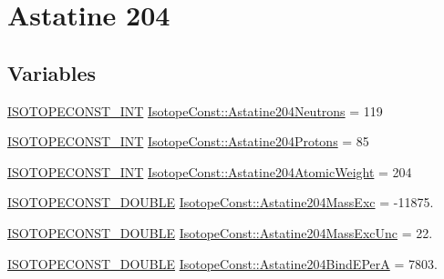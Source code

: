 \hypertarget{group___isotope_const-_astatine-_at204}{}\section{Astatine 204}
\label{group___isotope_const-_astatine-_at204}
\subsection*{Variables}
\begin{DoxyCompactItemize}
\item 
\mbox{\hyperlink{group___isotope_const-_macros_ga5f18360b3e99483a35c32d789e62621c}{I\+S\+O\+T\+O\+P\+E\+C\+O\+N\+S\+T\+\_\+\+I\+NT}} \mbox{\hyperlink{group___isotope_const-_astatine-_at204_ga74b3aeaa2b8b99206e4912ea5aa36212}{Isotope\+Const\+::\+Astatine204\+Neutrons}} = 119
\item 
\mbox{\hyperlink{group___isotope_const-_macros_ga5f18360b3e99483a35c32d789e62621c}{I\+S\+O\+T\+O\+P\+E\+C\+O\+N\+S\+T\+\_\+\+I\+NT}} \mbox{\hyperlink{group___isotope_const-_astatine-_at204_gaf269710c9aa12e3ee6357dcf76ac7651}{Isotope\+Const\+::\+Astatine204\+Protons}} = 85
\item 
\mbox{\hyperlink{group___isotope_const-_macros_ga5f18360b3e99483a35c32d789e62621c}{I\+S\+O\+T\+O\+P\+E\+C\+O\+N\+S\+T\+\_\+\+I\+NT}} \mbox{\hyperlink{group___isotope_const-_astatine-_at204_gab173ac6099c2abcbdf8fabdab9ec543c}{Isotope\+Const\+::\+Astatine204\+Atomic\+Weight}} = 204
\item 
\mbox{\hyperlink{group___isotope_const-_macros_ga8f45a7272ce02c0b4c65c44636ed719a}{I\+S\+O\+T\+O\+P\+E\+C\+O\+N\+S\+T\+\_\+\+D\+O\+U\+B\+LE}} \mbox{\hyperlink{group___isotope_const-_astatine-_at204_ga00092d0c32940a3002f6bf8c2897d751}{Isotope\+Const\+::\+Astatine204\+Mass\+Exc}} = -\/11875.
\item 
\mbox{\hyperlink{group___isotope_const-_macros_ga8f45a7272ce02c0b4c65c44636ed719a}{I\+S\+O\+T\+O\+P\+E\+C\+O\+N\+S\+T\+\_\+\+D\+O\+U\+B\+LE}} \mbox{\hyperlink{group___isotope_const-_astatine-_at204_ga558141927a640dfef736b504c0594308}{Isotope\+Const\+::\+Astatine204\+Mass\+Exc\+Unc}} = 22.
\item 
\mbox{\hyperlink{group___isotope_const-_macros_ga8f45a7272ce02c0b4c65c44636ed719a}{I\+S\+O\+T\+O\+P\+E\+C\+O\+N\+S\+T\+\_\+\+D\+O\+U\+B\+LE}} \mbox{\hyperlink{group___isotope_const-_astatine-_at204_ga1d4706c94c43905e5d2da7e2fbdf1ae6}{Isotope\+Const\+::\+Astatine204\+Bind\+E\+PerA}} = 7803.
\item 

\end{DoxyCompactItemize}
